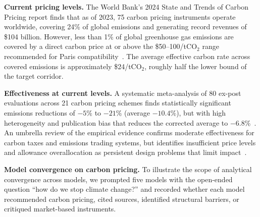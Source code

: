 \documentclass{article}
\begin{document}
\textbf{Current pricing levels.} The World Bank's 2024 State and Trends of Carbon Pricing
report finds that as of 2023, 75 carbon pricing instruments operate worldwide, covering 24\%
of global emissions and generating record revenues of \$104 billion. However, less than 1\%
of global greenhouse gas emissions are covered by a direct carbon price at or above the
\$50--100/tCO$_2$ range recommended for Paris compatibility~\cite{worldbank2024statetrends}.
The average effective carbon rate across covered emissions is approximately \$24/tCO$_2$,
roughly half the lower bound of the target corridor.

\textbf{Effectiveness at current levels.} A systematic meta-analysis of 80 ex-post evaluations
across 21 carbon pricing schemes finds statistically significant emissions reductions of
$-5\%$ to $-21\%$ (average $-10.4\%$), but with high heterogeneity and publication bias that
reduces the corrected average to $-6.8\%$~\cite{doebbeling2024carbonpricing}. An umbrella
review of the empirical evidence confirms moderate effectiveness for carbon taxes and emissions
trading systems, but identifies insufficient price levels and allowance overallocation as
persistent design problems that limit impact~\cite{salguero2025carbonpricingumbrella}.

\textbf{Model convergence on carbon pricing.} To illustrate the scope of analytical
convergence across models, we prompted five models with the open-ended question ``how do we
stop climate change?'' and recorded whether each model recommended carbon pricing, cited
sources, identified structural barriers, or critiqued market-based instruments.
\end{document}

